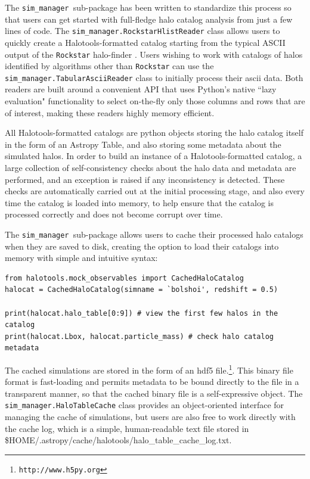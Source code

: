 \documentclass[usenatbib,usegraphicx,letterpaper]{mn2e}
\newcommand{\sims}{{\tt sim\_manager }}
\begin{document}
The \sims sub-package has been written to standardize this process so that users can get started with full-fledge halo catalog analysis from just a few lines of code. The {\tt sim\_manager.RockstarHlistReader} class allows users to quickly create a Halotools-formatted catalog starting from the typical ASCII output of the {\tt Rockstar} halo-finder \citep{rockstar_trees, behroozi_rockstar11}. Users wishing to work with catalogs of halos identified by algorithms other than {\tt Rockstar} can use the {\tt sim\_manager.TabularAsciiReader} class to initially process their ascii data. Both readers are built around a convenient API that uses Python's native ``lazy evaluation" functionality to select on-the-fly only those columns and rows that are of interest, making these readers highly memory efficient. 

All Halotools-formatted catalogs are python objects storing the halo catalog itself in the form of an Astropy Table, and also storing some metadata about the simulated halos. In order to build an instance of a Halotools-formatted catalog, a large collection of self-consistency checks about the halo data and metadata are performed, and an exception is raised if any inconsistency is detected. These checks are automatically carried out at the initial processing stage, and also every time the catalog is loaded into memory, to help ensure that the catalog is processed correctly and does not become corrupt over time. 

The \sims sub-package allows users to cache their processed halo catalogs when they are saved to disk, creating the option to load their catalogs into memory with simple and intuitive syntax: 

\begin{lstlisting}[float=*t, label=some-code,caption = Loading a cached halo catalog into memory]
from halotools.mock_observables import CachedHaloCatalog
halocat = CachedHaloCatalog(simname = `bolshoi', redshift = 0.5)

print(halocat.halo_table[0:9]) # view the first few halos in the catalog
print(halocat.Lbox, halocat.particle_mass) # check halo catalog metadata
\end{lstlisting}

The cached simulations are stored in the form of an hdf5 file.\footnote{\tt http://www.h5py.org}. This binary file format is fast-loading and permits metadata to be bound directly to the file in a transparent manner, so that the cached binary file is a self-expressive object. The {\tt sim\_manager.HaloTableCache} class provides an object-oriented interface for managing the cache of simulations, but users are also free to work directly with the cache log, which is a simple, human-readable text file stored in \$HOME/.astropy/cache/halotools/halo\_table\_cache\_log.txt.
\end{document}
